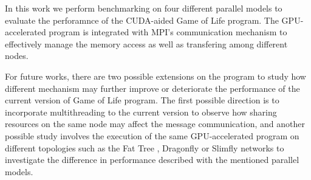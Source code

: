 
In this work we perform benchmarking on four different parallel models to evaluate the perforamnce of the CUDA-aided Game of Life program. The GPU-accelerated program is integrated with MPI's communication mechanism to effectively manage the memory access as well as transfering among different nodes. 

For future works, there are two possible extensions on the program to study how different mechanism may further improve or deteriorate the performance of the current version of Game of Life program. The first possible direction is to incorporate multithreading to the current version to observe how sharing resources on the same node may affect the message communication, and another possible study involves the execution of the same GPU-accelerated program on different topologies such as the Fat Tree \cite{leiserson1985fat}, Dragonfly \cite{kim2009cost} or Slimfly \cite{wolfe2016modeling} networks to investigate the difference in performance described with the mentioned parallel models. 